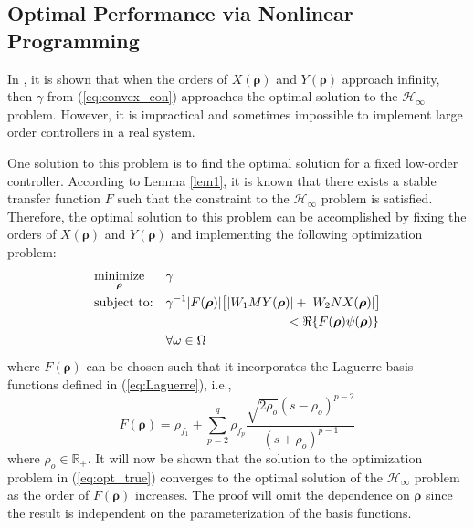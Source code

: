\documentclass[letterpaper, 10 pt, conference]{ieeeconf}  %
\begin{document}
\subsection{Optimal Performance via Nonlinear Programming}
In \cite{KNZ16}, it is shown that when the orders of $X(\bm{\rho})$ and $Y(\bm{\rho})$ approach infinity, then $\gamma$ from (\ref{eq:convex_con}) approaches the optimal solution to the $\mathcal{H}_{\infty}$ problem. However, it is impractical and sometimes impossible to implement large order controllers in a real system.

One solution to this problem is to find the optimal solution for a fixed low-order controller. According to Lemma \ref{lem1}, it is known that there exists a stable transfer function $F$ such that the constraint to the $\mathcal{H}_{\infty}$ problem is satisfied. Therefore, the optimal solution to this problem can be accomplished by fixing the orders of $X(\bm{\rho})$ and $Y(\bm{\rho})$ and implementing the following optimization problem:
\begin{equation} \label{eq:opt_true}
\begin{aligned}
& \underset{ \bm{\rho}}{\text{minimize}}
& & \gamma  \\
& \text{subject to:} & & \gamma^{-1} |F(\bm{\rho})|\big[  |W_1MY(\bm{\rho})| + |W_2 NX(\bm{\rho})| \big] \\ &&& \hspace{3.3cm}<   \Re\{F(\bm{\rho})\psi(\bm{\rho}) \}  \\ 
& & & \forall \omega \in \Omega \quad 
\end{aligned}
\end{equation}
where $F(\bm{\rho})$ can be chosen such that it incorporates the Laguerre basis functions defined in (\ref{eq:Laguerre}), i.e.,
\begin{equation} \label{eq:Laguerre_sum_c}
F(\bm{\rho}) = \rho_{f_{1}}+ \sum_{p=2}^{q} \rho_{f_{p}}\frac{\sqrt{2 \rho_o}(s-\rho_o)^{p-2}}{(s+\rho_o)^{p-1}}
\end{equation}
where $\rho_o \in \mathbb{R}_+$. It will now be shown that the solution to the optimization problem in (\ref{eq:opt_true}) converges to the optimal solution of the $\mathcal{H}_\infty$ problem as the order of $F(\bm{\rho})$ increases. The proof will omit the dependence on $\bm{\rho}$ since the result is independent on the parameterization of the basis functions.
\end{document}
